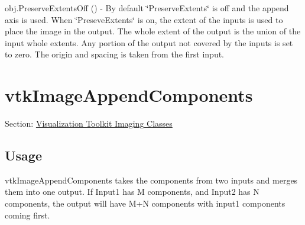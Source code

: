\begin{DoxyItemize}
\item {\ttfamily obj.\-Preserve\-Extents\-Off ()} -\/ By default \char`\"{}\-Preserve\-Extents\char`\"{} is off and the append axis is used. When \char`\"{}\-Preseve\-Extents\char`\"{} is on, the extent of the inputs is used to place the image in the output. The whole extent of the output is the union of the input whole extents. Any portion of the output not covered by the inputs is set to zero. The origin and spacing is taken from the first input.  
\end{DoxyItemize}\hypertarget{vtkimaging_vtkimageappendcomponents}{}\section{vtk\-Image\-Append\-Components}\label{vtkimaging_vtkimageappendcomponents}
Section\-: \hyperlink{sec_vtkimaging}{Visualization Toolkit Imaging Classes} \hypertarget{vtkwidgets_vtkxyplotwidget_Usage}{}\subsection{Usage}\label{vtkwidgets_vtkxyplotwidget_Usage}
vtk\-Image\-Append\-Components takes the components from two inputs and merges them into one output. If Input1 has M components, and Input2 has N components, the output will have M+\-N components with input1 components coming first.

